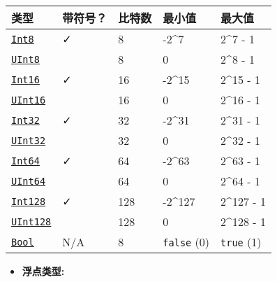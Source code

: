 \begin{table}[h]

\begin{tabulary}{\linewidth}{|L|L|L|L|L|}
\hline
类型 & 带符号？ & 比特数 & 最小值 & 最大值 \\
\hline
\hyperlink{5857518405103968275}{\texttt{Int8}} & ✓ & 8 & -2{\textasciicircum}7 & 2{\textasciicircum}7 - 1 \\
\hline
\hyperlink{6609065134969660118}{\texttt{UInt8}} &  & 8 & 0 & 2{\textasciicircum}8 - 1 \\
\hline
\hyperlink{6667287249103968645}{\texttt{Int16}} & ✓ & 16 & -2{\textasciicircum}15 & 2{\textasciicircum}15 - 1 \\
\hline
\hyperlink{7018610346698168012}{\texttt{UInt16}} &  & 16 & 0 & 2{\textasciicircum}16 - 1 \\
\hline
\hyperlink{10103694114785108551}{\texttt{Int32}} & ✓ & 32 & -2{\textasciicircum}31 & 2{\textasciicircum}31 - 1 \\
\hline
\hyperlink{8690996847580776341}{\texttt{UInt32}} &  & 32 & 0 & 2{\textasciicircum}32 - 1 \\
\hline
\hyperlink{7720564657383125058}{\texttt{Int64}} & ✓ & 64 & -2{\textasciicircum}63 & 2{\textasciicircum}63 - 1 \\
\hline
\hyperlink{5500998675195555601}{\texttt{UInt64}} &  & 64 & 0 & 2{\textasciicircum}64 - 1 \\
\hline
\hyperlink{8012327724714767060}{\texttt{Int128}} & ✓ & 128 & -2{\textasciicircum}127 & 2{\textasciicircum}127 - 1 \\
\hline
\hyperlink{14811222188335428522}{\texttt{UInt128}} &  & 128 & 0 & 2{\textasciicircum}128 - 1 \\
\hline
\hyperlink{46725311238864537}{\texttt{Bool}} & N/A & 8 & \texttt{false} (0) & \texttt{true} (1) \\
\hline
\end{tabulary}

\end{table}



\begin{itemize}
\item \textbf{浮点类型:}

\end{itemize}



